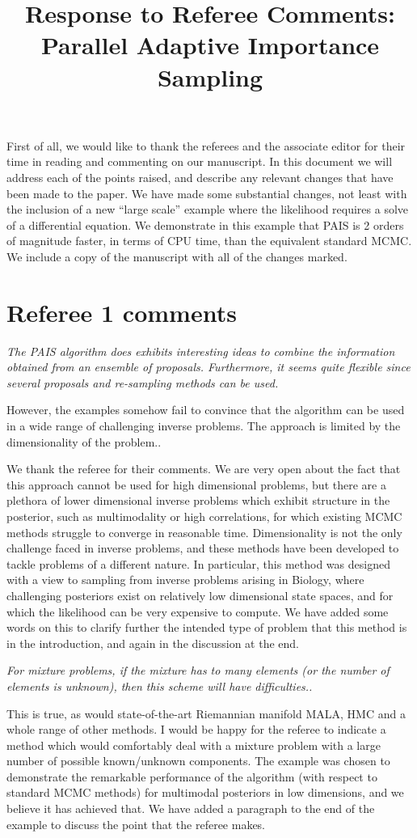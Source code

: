 \documentclass{article}
\newcommand{\comment}[2]{\vspace{0.6cm}{\bf Comment:} {\it #1.}

\vspace{0.3cm}{\bf Answer:} #2}
\begin{document}
\title{Response to Referee Comments: Parallel Adaptive Importance Sampling}
\maketitle
First of all, we would like to thank the referees and the associate editor for
their time in reading and commenting on our manuscript. In this document
we will address each of the points raised, and describe any relevant
changes that have been made to the paper. We have made some substantial changes, not least with the inclusion of a new ``large scale'' example where the likelihood requires a solve of a differential equation. We demonstrate in this example that PAIS is 2 orders of magnitude faster, in terms of CPU time, than the equivalent standard MCMC. We include a copy of the manuscript with all of the changes marked.

\section*{Referee 1 comments}

\comment{The PAIS algorithm does exhibits interesting ideas to combine the information 
obtained from an ensemble of proposals. Furthermore, it seems quite flexible 
since several proposals and re-sampling methods can be used.

However, the examples somehow fail to convince that the algorithm can be used 
in a wide range of challenging inverse problems. The approach is limited by the 
dimensionality of the problem.}{We thank the referee for their comments. We are very open about the fact that this approach cannot be used for high dimensional problems, but there are a plethora of lower dimensional inverse problems which exhibit structure in the posterior, such as multimodality or high correlations, for which existing MCMC methods struggle to converge in reasonable time. Dimensionality is not the only challenge faced in inverse problems, and these methods have been developed to tackle problems of a different nature. In particular, this method was designed with a view to sampling from inverse problems arising in Biology, where challenging posteriors exist on relatively low dimensional state spaces, and for which the likelihood can be very expensive to compute. We have added some words on this to clarify further the intended type of problem that this method is in the introduction, and again in the discussion at the end.}  %

\comment{For mixture problems, if the mixture has to many 
elements (or the number of elements is unknown), then this scheme will have 
difficulties.}{This is true, as would state-of-the-art Riemannian manifold MALA, HMC and a whole range of other methods. I would be happy for the referee to indicate a method which would comfortably deal with a mixture problem with a large number of possible known/unknown components. The example was chosen to demonstrate the remarkable performance of the algorithm (with respect to standard MCMC methods) for multimodal posteriors in low dimensions, and we believe it has achieved that. We have added a paragraph to the end of the example to discuss the point that the referee makes.}%
\end{document}
